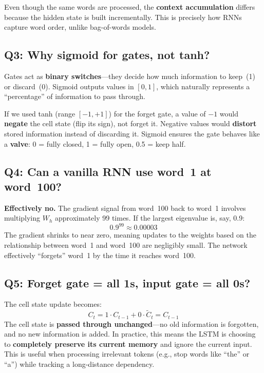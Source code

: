 \documentclass[11pt,a4paper]{article}
\begin{document}
Even though the same words are processed, the \textbf{context accumulation} differs because the hidden state is built incrementally. This is precisely how RNNs capture word order, unlike bag-of-words models.

\subsection*{Q3: Why sigmoid for gates, not tanh?}

Gates act as \textbf{binary switches}---they decide how much information to keep~(1) or discard~(0). Sigmoid outputs values in $[0, 1]$, which naturally represents a ``percentage'' of information to pass through.

If we used tanh (range $[-1, +1]$) for the forget gate, a value of $-1$ would \textbf{negate} the cell state (flip its sign), not forget it. Negative values would \textbf{distort} stored information instead of discarding it. Sigmoid ensures the gate behaves like a \textbf{valve}: 0 = fully closed, 1 = fully open, 0.5 = keep half.

\subsection*{Q4: Can a vanilla RNN use word~1 at word~100?}

\textbf{Effectively no.} The gradient signal from word~100 back to word~1 involves multiplying $W_h$ approximately 99 times. If the largest eigenvalue is, say, 0.9:
\[
0.9^{99} \approx 0.00003
\]
The gradient shrinks to near zero, meaning updates to the weights based on the relationship between word~1 and word~100 are negligibly small. The network effectively ``forgets'' word~1 by the time it reaches word~100.

\subsection*{Q5: Forget gate = all 1s, input gate = all 0s?}

The cell state update becomes:
\[
C_t = 1 \cdot C_{t-1} + 0 \cdot \tilde{C}_t = C_{t-1}
\]
The cell state is \textbf{passed through unchanged}---no old information is forgotten, and no new information is added. In practice, this means the LSTM is choosing to \textbf{completely preserve its current memory} and ignore the current input. This is useful when processing irrelevant tokens (e.g., stop words like ``the'' or ``a'') while tracking a long-distance dependency.
\end{document}
